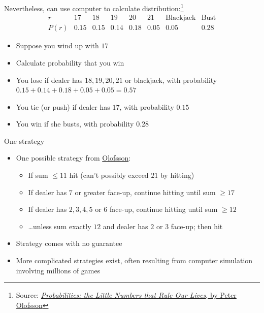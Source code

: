 \documentclass{beamer}
\theoremstyle{definition}
\begin{document}
\begin{frame}
Nevertheless, can use computer to calculate
distribution:\footnote{Source:
\href{http://www.wiley.com/WileyCDA/WileyTitle/productCd-0470624450.html}
{\color{blue}
{\em Probabilities: the Little Numbers that Rule Our Lives},
by Peter Olofsson}}
\[\begin{array}{r|lllllll}
r&17&18&19&20&21&\text{Blackjack}&\text{Bust}\\\hline
P\left(r\right)&0.15&0.15&0.14&0.18&0.05&0.05&0.28
\end{array}\]
\begin{example}
\begin{itemize}
\item Suppose you wind up with $17$
\item Calculate probability that you win
\item You lose if dealer has $18,19,20,21$ or blackjack, with
probability $0.15+0.14+0.18+0.05+0.05=0.57$
\item You tie (or \alert{push})
if dealer has $17$, with probability $0.15$
\item You win if she busts, with probability $0.28$
\end{itemize}
\end{example}
\end{frame}

\begin{frame}{One strategy}
\begin{itemize}
\item One possible strategy from
\href{http://www.wiley.com/WileyCDA/WileyTitle/productCd-0470624450.html}
{\color{blue}Olofsson}:
\begin{itemize}
\item If sum $\le 11$ hit (can't possibly exceed $21$ by hitting)
\item If dealer has $7$ or greater face-up, continue hitting until
sum $\ge 17$
\item If dealer has $2,3,4,5$ or $6$ face-up, continue hitting
until sum $\ge 12$
\item \dots unless sum exactly $12$ and dealer has $2$ or $3$
face-up; then hit
\end{itemize}
\item Strategy comes with no guarantee
\item More complicated strategies exist, often resulting
from computer simulation involving millions of games
\end{itemize}
\end{frame}
\end{document}
